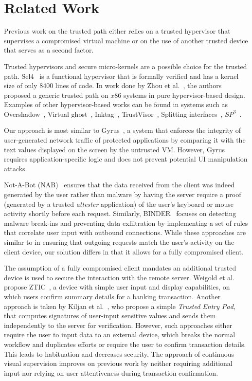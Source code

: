 \section{Related Work} 
\label{integriscreen:sec:relatedWork}

Previous work on the trusted path either relies on a trusted hypervisor that supervises a compromised virtual machine or on the use of another trusted device that serves as a second factor.

Trusted hypervisors and secure micro-kernels are a possible choice for the trusted path. Sel4~\cite{klein2009sel4} is a functional hypervisor that is formally verified and has a kernel size of only $8400$ lines of code. In work done by Zhou et al.~\cite{zhou2012building}, the authors proposed a generic trusted path on $x86$ systems in pure hypervisor-based design. Examples of other hypervisor-based works can be found in systems such as Overshadow~\cite{Overshadow}, Virtual ghost~\cite{criswell2014virtual}, Inktag~\cite{hofmann2013inktag}, TrustVisor~\cite{mccune2010trustvisor}, Splitting interfaces~\cite{ta2006splitting}, $SP^3$~\cite{yang2008using}.

Our approach is most similar to Gyrus~\cite{gyrus}, a system that enforces the integrity of user-generated network traffic of protected applications by comparing it with the text values displayed on the screen by the untrusted VM. However, Gyrus requires application-specific logic and does not prevent potential UI manipulation attacks.

Not-A-Bot (NAB)~\cite{nab} ensures that the data received from the client was indeed generated by the user rather than malware by having the server require a proof (generated by a trusted \emph{attester} application) of the user's keyboard or mouse activity shortly before each request.
Similarly, BINDER~\cite{binder} focuses on detecting malware break-ins and preventing data exfiltration by implementing a set of rules that correlate user input with outbound connections. While these approaches are similar to \sysname in ensuring that outgoing requests match the user's activity on the client device, our solution differs in that it allows for a fully compromised client.


The assumption of a fully compromised client mandates an additional trusted device is used to secure the interaction with the remote server.
Weigold et al. propose ZTIC~\cite{weigold2011}, a device with simple user input and display capabilities, on which users confirm summary details for a banking transaction. Another approach is taken by Kiljan et al.~\cite{6978928}, who propose a simple \emph{Trusted Entry Pad}, that computes signatures of user-input sensitive values and sends them independently to the server for verification. However, such approaches either require the user to input data to an external device, which breaks the normal workflow and duplicates efforts or require the user to confirm transaction details. This leads to habituation and decreases security. The approach of continuous visual supervision improves on previous work by neither requiring additional input nor relying on user attentiveness during transaction confirmation.